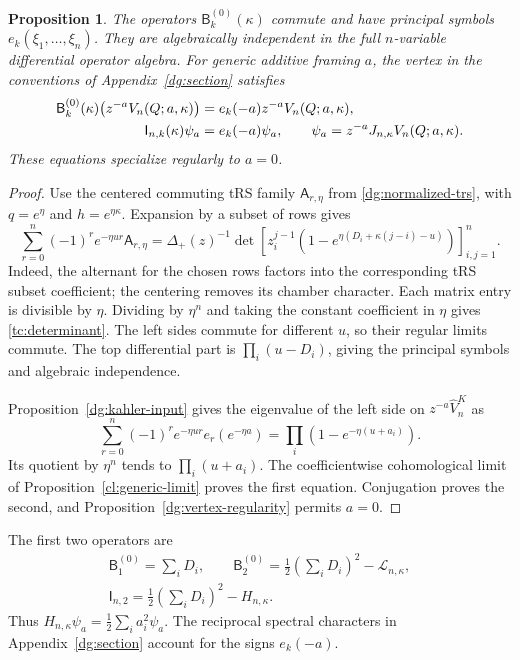 \documentclass[11pt]{amsart}
\newtheorem{proposition}[theorem]{Proposition}
\theoremstyle{definition}
\theoremstyle{remark}
\numberwithin{equation}{section}
\begin{document}
\begin{proposition}\label{dg:full-family}
The operators $\mathsf B_k^{(0)}(\kappa)$ commute and have
principal symbols $e_k(\xi_1,\ldots,\xi_n)$. They are
algebraically independent in the full $n$-variable differential
operator algebra. For generic additive framing $a$, the vertex
in the conventions of Appendix~\ref{dg:section} satisfies
\begin{align}\label{dg:geometric-joint-equations}
 \mathsf B_k^{(0)}(\kappa)
    \bigl(z^{-a}V_n(Q;a,\kappa)\bigr)
 &=e_k(-a)z^{-a}V_n(Q;a,\kappa),\\
 \mathsf I_{n,k}(\kappa)\psi_a&=e_k(-a)\psi_a,
 \qquad \psi_a=z^{-a}J_{n,\kappa}V_n(Q;a,\kappa).\notag
\end{align}
These equations specialize regularly to $a=0$.
\end{proposition}

\begin{proof}
Use the centered commuting tRS family
$\mathsf A_{r,\eta}$ from \eqref{dg:normalized-trs}, with
$q=e^\eta$ and $h=e^{\eta\kappa}$. Expansion by a subset of
rows gives
\begin{equation}\label{cm:generating-limit}
 \sum_{r=0}^n(-1)^re^{-\eta ur}\mathsf A_{r,\eta}
 =\Delta_+(z)^{-1}
 \det\left[z_i^{j-1}
 \left(1-e^{\eta(D_i+\kappa(j-i)-u)}\right)\right]_{i,j=1}^n.
\end{equation}
Indeed, the alternant for the chosen rows factors into the
corresponding tRS subset coefficient; the centering removes its
chamber character. Each matrix entry is divisible by $\eta$.
Dividing by $\eta^n$ and taking the constant coefficient in
$\eta$ gives \eqref{tc:determinant}. The left sides commute for
different $u$, so their regular limits commute. The top
differential part is $\prod_i(u-D_i)$, giving the principal
symbols and algebraic independence.

Proposition~\ref{dg:kahler-input} gives the eigenvalue of the left
side on $z^{-a}\widehat V_n^K$ as
\[
 \sum_{r=0}^n(-1)^re^{-\eta ur}e_r(e^{-\eta a})
 =\prod_i\left(1-e^{-\eta(u+a_i)}\right).
\]
Its quotient by $\eta^n$ tends to $\prod_i(u+a_i)$.
The coefficientwise cohomological limit of
Proposition~\ref{cl:generic-limit} proves the first equation.
Conjugation proves the second, and
Proposition~\ref{dg:vertex-regularity} permits $a=0$.
\end{proof}

The first two operators are
\begin{equation}\label{cm:joint-generators}
\begin{gathered}
 \mathsf B_1^{(0)}=\sum_iD_i,\qquad
 \mathsf B_2^{(0)}=\frac12\left(\sum_iD_i\right)^2
                         -\mathcal L_{n,\kappa},\\
 \mathsf I_{n,2}=\frac12\left(\sum_iD_i\right)^2-H_{n,\kappa}.
\end{gathered}
\end{equation}
Thus $H_{n,\kappa}\psi_a=\frac12\sum_i a_i^2\psi_a$.
The reciprocal spectral characters in Appendix~\ref{dg:section}
account for the signs $e_k(-a)$.
\end{document}
